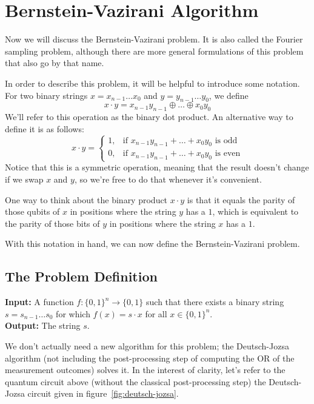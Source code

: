 \chapter{Bernstein-Vazirani Algorithm}

Now we will discuss the Bernstein-Vazirani problem. It is also called the Fourier sampling problem, although there are more general formulations of this problem that also go by that name.

In order to describe this problem, it will be helpful to introduce some notation. For two binary strings $x = x_{n-1} \ldots x_0$ and $y = y_{n-1} \ldots y_0$, we define
\[
x \cdot y = x_{n-1}y_{n-1} \oplus \ldots \oplus x_0y_0
\]
We'll refer to this operation as the binary dot product. An alternative way to define it is as follows:
\[
x \cdot y = 
\begin{cases} 
1, & \text{if } x_{n-1}y_{n-1} + \ldots + x_0y_0 \text{ is odd} \\
0, & \text{if } x_{n-1}y_{n-1} + \ldots + x_0y_0 \text{ is even}
\end{cases}
\]
Notice that this is a symmetric operation, meaning that the result doesn't change if we swap $x$ and $y$, so we're free to do that whenever it's convenient.

One way to think about the binary product $x \cdot y$ is that it equals the parity of those qubits of $x$ in positions where the string $y$ has a $1$, which is equivalent to the parity of those bits of $y$ in positions where the string $x$ has a $1$.

With this notation in hand, we can now define the Bernstein-Vazirani problem.


\section{The Problem Definition}

\textbf{Input: } A function $f:\{0,1\}^n \rightarrow \{0,1\}$ such that there exists a binary string $s = s_{n-1} \ldots s_0$ for which $f(x) = s \cdot x$ for all $x \in \{0,1\}^n$.\\
\textbf{Output: } The string $s$.

We don't actually need a new algorithm for this problem; the Deutsch-Jozsa algorithm (not including the post-processing step of computing the OR of the measurement outcomes) solves it. In the interest of clarity, let's refer to the quantum circuit above (without the classical post-processing step) the Deutsch-Jozsa circuit given in figure~\ref{fig:deutsch-jozsa}.

